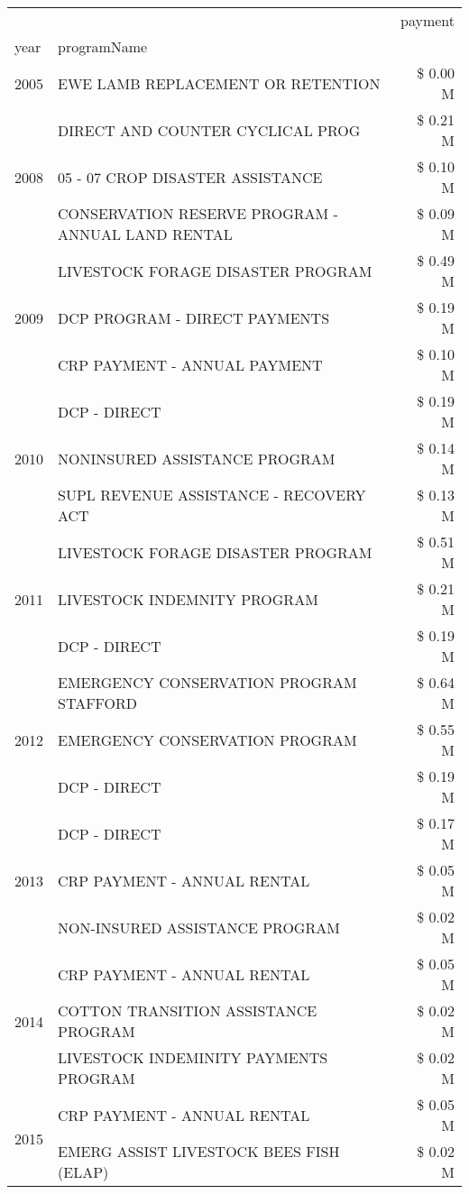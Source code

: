 \begin{tabular}{llr}
\toprule
 &  & payment \\
year & programName &  \\
\midrule
2005 & EWE LAMB REPLACEMENT OR RETENTION & \$ 0.00 M \\
\cline{1-3}
\multirow[t]{3}{*}{2008} & DIRECT AND COUNTER CYCLICAL PROG & \$ 0.21 M \\
 & 05 - 07 CROP DISASTER ASSISTANCE & \$ 0.10 M \\
 & CONSERVATION RESERVE PROGRAM - ANNUAL LAND RENTAL & \$ 0.09 M \\
\cline{1-3}
\multirow[t]{3}{*}{2009} & LIVESTOCK FORAGE DISASTER  PROGRAM & \$ 0.49 M \\
 & DCP PROGRAM - DIRECT PAYMENTS & \$ 0.19 M \\
 & CRP PAYMENT - ANNUAL PAYMENT & \$ 0.10 M \\
\cline{1-3}
\multirow[t]{3}{*}{2010} & DCP - DIRECT & \$ 0.19 M \\
 & NONINSURED ASSISTANCE PROGRAM & \$ 0.14 M \\
 & SUPL REVENUE ASSISTANCE - RECOVERY ACT & \$ 0.13 M \\
\cline{1-3}
\multirow[t]{3}{*}{2011} & LIVESTOCK FORAGE DISASTER PROGRAM & \$ 0.51 M \\
 & LIVESTOCK INDEMNITY PROGRAM & \$ 0.21 M \\
 & DCP - DIRECT & \$ 0.19 M \\
\cline{1-3}
\multirow[t]{3}{*}{2012} & EMERGENCY CONSERVATION PROGRAM STAFFORD & \$ 0.64 M \\
 & EMERGENCY CONSERVATION PROGRAM & \$ 0.55 M \\
 & DCP - DIRECT & \$ 0.19 M \\
\cline{1-3}
\multirow[t]{3}{*}{2013} & DCP - DIRECT & \$ 0.17 M \\
 & CRP PAYMENT - ANNUAL RENTAL & \$ 0.05 M \\
 & NON-INSURED ASSISTANCE PROGRAM & \$ 0.02 M \\
\cline{1-3}
\multirow[t]{3}{*}{2014} & CRP PAYMENT - ANNUAL RENTAL & \$ 0.05 M \\
 & COTTON TRANSITION ASSISTANCE PROGRAM & \$ 0.02 M \\
 & LIVESTOCK INDEMINITY PAYMENTS PROGRAM & \$ 0.02 M \\
\cline{1-3}
\multirow[t]{3}{*}{2015} & CRP PAYMENT - ANNUAL RENTAL & \$ 0.05 M \\
 & EMERG ASSIST LIVESTOCK BEES FISH (ELAP) & \$ 0.02 M \\

\end{tabular}
